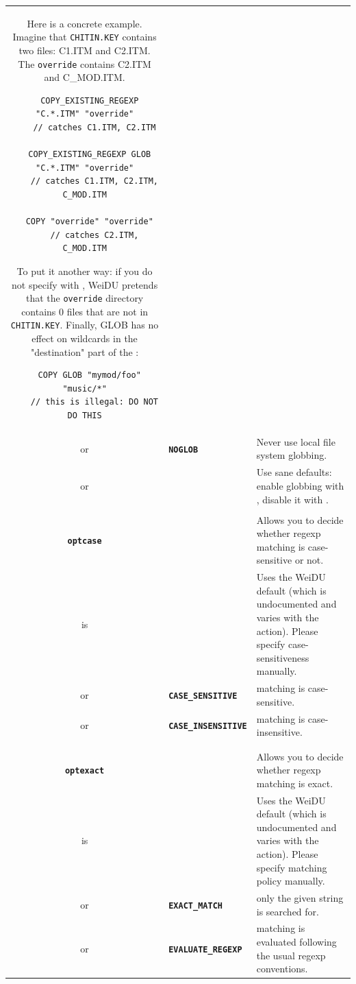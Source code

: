 \documentclass{article}
\def\ttref#1{\ahrefloc{#1}{\tt #1}}
\def\DEFINE#1{{\tt \bf #1}\label{#1}\index{#1}}
\def\t#1{{\tt #1}}
\begin{document}
\begin{tabular}{cp{10in}|p{10in}}
  Here is a concrete example. Imagine that \t{CHITIN.KEY} contains
  two files: C1.ITM and C2.ITM. The \t{override} contains C2.ITM and
  C\_MOD.ITM.
\begin{verbatim}
  COPY_EXISTING_REGEXP "C.*.ITM" "override"
    // catches C1.ITM, C2.ITM

  COPY_EXISTING_REGEXP GLOB "C.*.ITM" "override"
    // catches C1.ITM, C2.ITM, C_MOD.ITM

  COPY "override" "override"
    // catches C2.ITM, C_MOD.ITM
\end{verbatim}
  To put it another way: if you do not specify \ttref{GLOB} with
  \ttref{COPY_EXISTING}, WeiDU pretends that the \t{override} directory
  contains 0 files that are not in \t{CHITIN.KEY}. Finally, GLOB has no
  effect on wildcards in the "destination" part of the \ttref{COPY}:
\begin{verbatim}
  COPY GLOB "mymod/foo" "music/*"
    // this is illegal: DO NOT DO THIS
\end{verbatim}

  \\
  or & \DEFINE{NOGLOB} & Never use local file system globbing. \\
  or & & Use sane defaults: enable globbing with \ttref{COPY_EXISTING_REGEXP}, disable
  it with \ttref{COPY}. \\

\\

\DEFINE{optcase} && Allows you to decide whether regexp matching is case-sensitive
or not. \\
is  & & Uses the WeiDU default (which is undocumented and varies with the action).
      Please specify case-sensitiveness manually. \\
or & \DEFINE{CASE_SENSITIVE} & matching is case-sensitive. \\
or & \DEFINE{CASE_INSENSITIVE} & matching is case-insensitive. \\

\\

\\

\DEFINE{optexact} && Allows you to decide whether regexp matching is exact. \\
is  & & Uses the WeiDU default (which is undocumented and varies with the action).
      Please specify matching policy manually. \\
or & \DEFINE{EXACT_MATCH} & only the given string is searched for. \\
or & \DEFINE{EVALUATE_REGEXP} & matching is evaluated following the usual regexp
      conventions. \\


\end{tabular}
\end{document}
